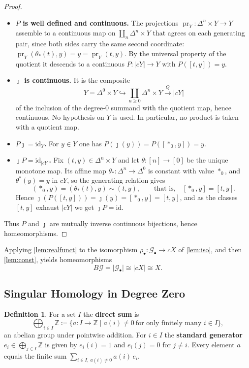 \documentclass{extracta-temp-26}
\makeatletter
\numberwithin{equation}{section}
\theoremstyle{definition}
\newtheorem{defi}[teo]{Definition}
\theoremstyle{remark}
\newcommand{\G}{\mathcal{G}}
\newcommand{\Z}{\mathbb{Z}}
\newcommand{\id}{\mathrm{id}}
\newcommand{\real}[1]{\lvert #1\rvert}
\DeclareMathOperator{\pr}{pr}
\newcommand{\term}[1]{\textbf{#1}}
\newcommand{\step}[1]{\textbf{#1}}
\newcommand{\keepwithnext}{\leavevmode\par\nobreak\@afterheading}
\newcommand{\subhead}[1]{\subsection*{#1}\keepwithnext}
\makeatother
\begin{document}
\begin{proof}\keepwithnext
\begin{itemize}
\item \step{\(P\) is well defined and continuous.}
The projections \(\pr_Y\colon\Delta^n\times Y\to Y\) assemble to a continuous map on \(\coprod_n\Delta^n\times Y\) that agrees on each generating pair, since both sides carry the same second coordinate: \(\pr_Y(\theta_*(t),y)=y=\pr_Y(t,y)\).
By the universal property of the quotient it descends to a continuous \(P\colon\real{cY}\to Y\) with \(P([t,y])=y\).
\item \step{\(\jmath\) is continuous.}
It is the composite
\begin{equation}\label{eq:jmath}
Y=\Delta^0\times Y\hookrightarrow\coprod_{n\ge0}\Delta^n\times Y\xrightarrow{Q}\real{cY}
\end{equation}
of the inclusion of the degree-\(0\) summand with the quotient map, hence continuous.
No hypothesis on \(Y\) is used.
In particular, no product is taken with a quotient map.
\item \step{\(P\jmath=\id_Y\).}
For \(y\in Y\) one has \(P(\jmath(y))=P([\ast_0,y])=y\).
\item \step{\(\jmath P=\id_{\real{cY}}\).}
Fix \((t,y)\in\Delta^n\times Y\) and let \(\theta\colon[n]\to[0]\) be the unique monotone map.
Its affine map \(\theta_*\colon\Delta^n\to\Delta^0\) is constant with value \(\ast_0\), and \(\theta^*(y)=y\) in \(cY\), so the generating relation gives
\begin{equation}\label{eq:const-relation}
(\ast_0,y)=(\theta_*(t),y)\sim(t,y),
\qquad\text{that is,}\quad[\ast_0,y]=[t,y].
\end{equation}
Hence \(\jmath(P([t,y]))=\jmath(y)=[\ast_0,y]=[t,y]\), and as the classes \([t,y]\) exhaust \(\real{cY}\) we get \(\jmath P=\id\).
\end{itemize}
Thus \(P\) and \(\jmath\) are mutually inverse continuous bijections, hence homeomorphisms.
\end{proof}

Applying \cref{lem:realfunct} to the isomorphism \(\rho_\bullet\colon\G_\bullet\to cX\) of \cref{lem:iso}, and then \cref{lem:const}, yields homeomorphisms
\begin{equation}\label{eq:BG}
B\G=\real{\G_\bullet}\cong\real{cX}\cong X.
\end{equation}

\subhead{Singular Homology in Degree Zero}

\begin{defi}\label{def:dirsum}
For a set \(I\) the \term{direct sum} is
\begin{equation}\label{eq:dirsum}
\bigoplus_{i\in I}\Z\coloneqq\{a\colon I\to\Z\mid a(i)\neq 0\ \text{for only finitely many }i\in I\},
\end{equation}
an abelian group under pointwise addition.
For \(i\in I\) the \term{standard generator} \(e_i\in\bigoplus_{j\in I}\Z\) is given by \(e_i(i)=1\) and \(e_i(j)=0\) for \(j\neq i\).
Every element \(a\) equals the finite sum \(\sum_{i\in I,\ a(i)\neq 0}a(i)\,e_i\).
\end{defi}
\end{document}
